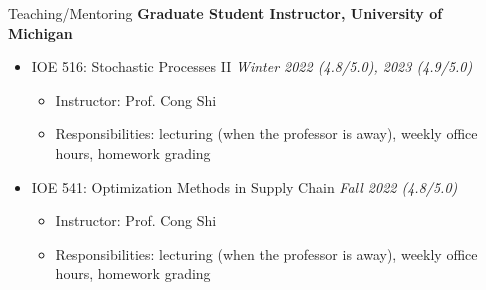 \documentclass{resume}
\begin{document}
\begin{rSection}{Teaching/Mentoring} 
{\bf Graduate Student Instructor, University of Michigan}
\begin{itemize}
        \item IOE 516: Stochastic Processes II \hfill {\em Winter 2022 (4.8/5.0), 2023 (4.9/5.0)}
        \begin{itemize}
            \item Instructor: Prof. Cong Shi
            \item Responsibilities: lecturing (when the professor is away), weekly office hours, homework grading
            
        \end{itemize}
        \item IOE 541:  Optimization Methods in Supply Chain \hfill {\em Fall 2022 (4.8/5.0)}
        \begin{itemize}
            \item Instructor: Prof. Cong Shi
            \item Responsibilities: lecturing (when the professor is away), weekly office hours, homework grading
            
            

\end{itemize}
\end{itemize}
\end{rSection}
\end{document}
